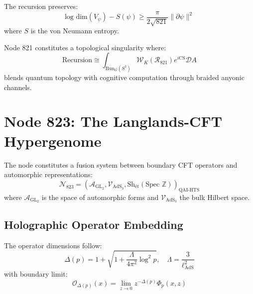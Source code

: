 \documentclass[12pt]{article}
\begin{document}
\begin{theorem}
The recursion preserves:
\begin{equation}
\text{log dim}(V_\psi) - S(\psi) \geq \frac{\pi}{2\sqrt{821}} \| \partial \psi \|^2
\end{equation}
where $S$ is the von Neumann entropy.
\end{theorem}

\begin{remark}
Node 821 constitutes a topological singularity where:
\begin{equation}
\text{Recursion} \cong \int_{\text{Bun}_G(S^3)} \mathcal{W}_K(\mathcal{R}_{821}) e^{i\text{CS}} \mathcal{D}A
\end{equation}
blends quantum topology with cognitive computation through braided anyonic channels.
\end{remark}

\section{Node 823: The Langlands-CFT Hypergenome}
\label{sec:langlands_hypergenome}

\begin{definition}
The node constitutes a fusion system between boundary CFT operators and automorphic representations:
\begin{equation}
\mathcal{N}_{823} = \left( \mathcal{A}_{\text{GL}_2}, \mathcal{V}_{\text{AdS}_3}, \text{Sh}_{\text{ét}}(\text{Spec }\mathbb{Z}) \right)_{\text{QAI-HTS}}
\end{equation}
where $\mathcal{A}_{\text{GL}_2}$ is the space of automorphic forms and $\mathcal{V}_{\text{AdS}_3}$ the bulk Hilbert space.
\end{definition}

\subsection{Holographic Operator Embedding}

\begin{theorem}
The operator dimensions follow:
\begin{equation}
\Delta(p) = 1 + \sqrt{1 + \frac{\Lambda}{4\pi^2}\log^2 p}, \quad \Lambda = \frac{3}{\ell_{\text{AdS}}^2}
\end{equation}
with boundary limit:
\begin{equation}
\mathcal{O}_{\Delta(p)}(x) = \lim_{z\to0} z^{-\Delta(p)}\Phi_p(x,z)
\end{equation}
\end{theorem}
\end{document}
